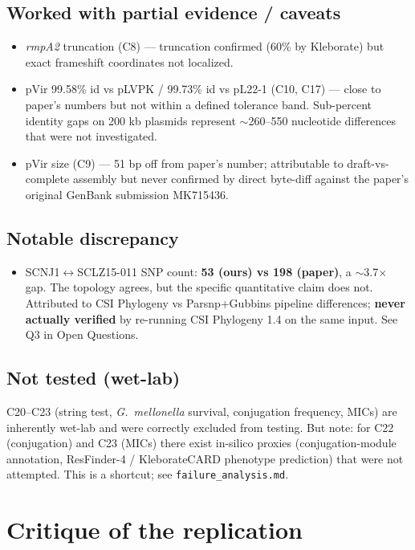 \documentclass[11pt,letterpaper]{article}
\begin{document}
\subsection{Worked with partial evidence / caveats}

\begin{itemize}[nosep]
\item \textit{rmpA2} truncation (C8) --- truncation confirmed (60\% by Kleborate) but exact frameshift coordinates not localized.
\item pVir 99.58\% id vs pLVPK / 99.73\% id vs pL22-1 (C10, C17) --- close to paper's numbers but not within a defined tolerance band. Sub-percent identity gaps on 200 kb plasmids represent $\sim$260--550 nucleotide differences that were not investigated.
\item pVir size (C9) --- 51 bp off from paper's number; attributable to draft-vs-complete assembly but never confirmed by direct byte-diff against the paper's original GenBank submission MK715436.
\end{itemize}

\subsection{Notable discrepancy}

\begin{itemize}[nosep]
\item SCNJ1$\leftrightarrow$SCLZ15-011 SNP count: \textbf{53 (ours) vs 198 (paper)}, a $\sim$3.7$\times$ gap. The topology agrees, but the specific quantitative claim does not. Attributed to CSI Phylogeny vs Parsnp+Gubbins pipeline differences; \textbf{never actually verified} by re-running CSI Phylogeny 1.4 on the same input. See Q3 in Open Questions.
\end{itemize}

\subsection{Not tested (wet-lab)}

C20--C23 (string test, \textit{G.\ mellonella} survival, conjugation frequency, MICs) are inherently wet-lab and were correctly excluded from testing. But note: for C22 (conjugation) and C23 (MICs) there exist in-silico proxies (conjugation-module annotation, ResFinder-4 / KleborateCARD phenotype prediction) that were not attempted. This is a shortcut; see \texttt{failure\_analysis.md}.

\section{Critique of the replication}
\label{sec:critique}
\end{document}

